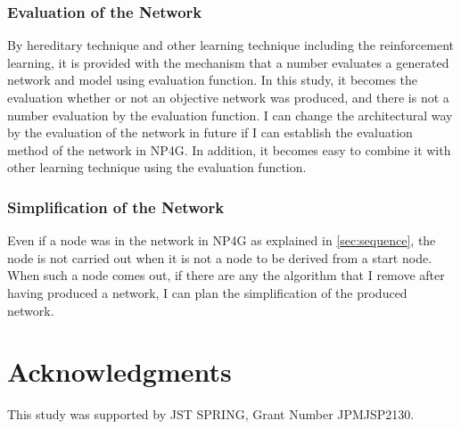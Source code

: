 \documentclass{article}
\begin{document}
\subsubsection {Evaluation of the Network}
By hereditary technique and other learning technique including the reinforcement learning, it is provided with the mechanism that a number evaluates a generated network and model using evaluation function.
In this study, it becomes the evaluation whether or not an objective network was produced, and there is not a number evaluation by the evaluation function.
I can change the architectural way by the evaluation of the network in future if I can establish the evaluation method of the network in NP4G.
In addition, it becomes easy to combine it with other learning technique using the evaluation function.

\subsubsection {Simplification of the Network}
Even if a node was in the network in NP4G as explained in \ref{sec:sequence}, the node is not carried out when it is not a node to be derived from a start node.
When such a node comes out, if there are any the algorithm that I remove after having produced a network, I can plan the simplification of the produced network.

\section*{Acknowledgments}
This study was supported by JST SPRING, Grant Number JPMJSP2130.


  
  
\end{document}
